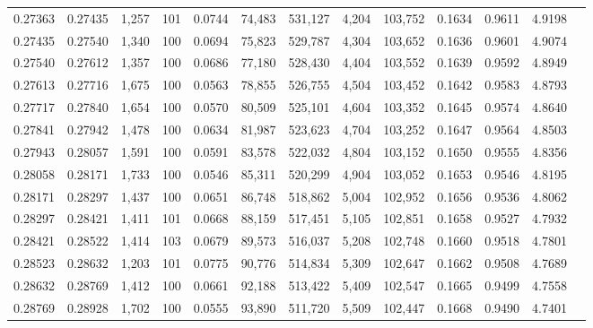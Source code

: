 \begin{tabular}{rrrrrrrrrrrrr}
0.27363 & 0.27435 & 1,257 & 101 &                                     0.0744 &  74,483 & 531,127 &   4,204 & 103,752 & 0.1634 & 0.9611 & 4.9198 \\
0.27435 & 0.27540 & 1,340 & 100 &                                     0.0694 &  75,823 & 529,787 &   4,304 & 103,652 & 0.1636 & 0.9601 & 4.9074 \\
0.27540 & 0.27612 & 1,357 & 100 &                                     0.0686 &  77,180 & 528,430 &   4,404 & 103,552 & 0.1639 & 0.9592 & 4.8949 \\
0.27613 & 0.27716 & 1,675 & 100 &                                     0.0563 &  78,855 & 526,755 &   4,504 & 103,452 & 0.1642 & 0.9583 & 4.8793 \\
0.27717 & 0.27840 & 1,654 & 100 &                                     0.0570 &  80,509 & 525,101 &   4,604 & 103,352 & 0.1645 & 0.9574 & 4.8640 \\
0.27841 & 0.27942 & 1,478 & 100 &                                     0.0634 &  81,987 & 523,623 &   4,704 & 103,252 & 0.1647 & 0.9564 & 4.8503 \\
0.27943 & 0.28057 & 1,591 & 100 &                                     0.0591 &  83,578 & 522,032 &   4,804 & 103,152 & 0.1650 & 0.9555 & 4.8356 \\
0.28058 & 0.28171 & 1,733 & 100 &                                     0.0546 &  85,311 & 520,299 &   4,904 & 103,052 & 0.1653 & 0.9546 & 4.8195 \\
0.28171 & 0.28297 & 1,437 & 100 &                                     0.0651 &  86,748 & 518,862 &   5,004 & 102,952 & 0.1656 & 0.9536 & 4.8062 \\
0.28297 & 0.28421 & 1,411 & 101 &                                     0.0668 &  88,159 & 517,451 &   5,105 & 102,851 & 0.1658 & 0.9527 & 4.7932 \\
0.28421 & 0.28522 & 1,414 & 103 &                                     0.0679 &  89,573 & 516,037 &   5,208 & 102,748 & 0.1660 & 0.9518 & 4.7801 \\
0.28523 & 0.28632 & 1,203 & 101 &                                     0.0775 &  90,776 & 514,834 &   5,309 & 102,647 & 0.1662 & 0.9508 & 4.7689 \\
0.28632 & 0.28769 & 1,412 & 100 &                                     0.0661 &  92,188 & 513,422 &   5,409 & 102,547 & 0.1665 & 0.9499 & 4.7558 \\
0.28769 & 0.28928 & 1,702 & 100 &                                     0.0555 &  93,890 & 511,720 &   5,509 & 102,447 & 0.1668 & 0.9490 & 4.7401 \\

\end{tabular}
